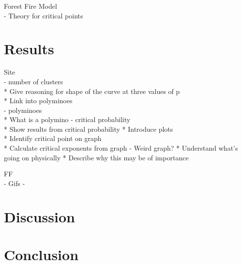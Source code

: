 \documentclass[%
 reprint,
 amsmath,amssymb,
 aps,
]{revtex4-2}
\begin{document}
Forest Fire Model\\
- Theory for critical points\\

\section{Results}

Site\\
- number of clusters\\
* Give reasoning for shape of the curve at three values of p\\
* Link into polyminoes\\
- polyminoes\\
* What is a polymino
- critical probability\\
* Show results from critical probability 
* Introduce plots\\
* Identify critical point on graph\\
* Calculate critical exponents from graph
- Weird graph?
* Understand what's going on physically
* Describe why this may be of importance

FF\\
- Gifs
- 

\section{Discussion}

\section{Conclusion}

\end{document}
